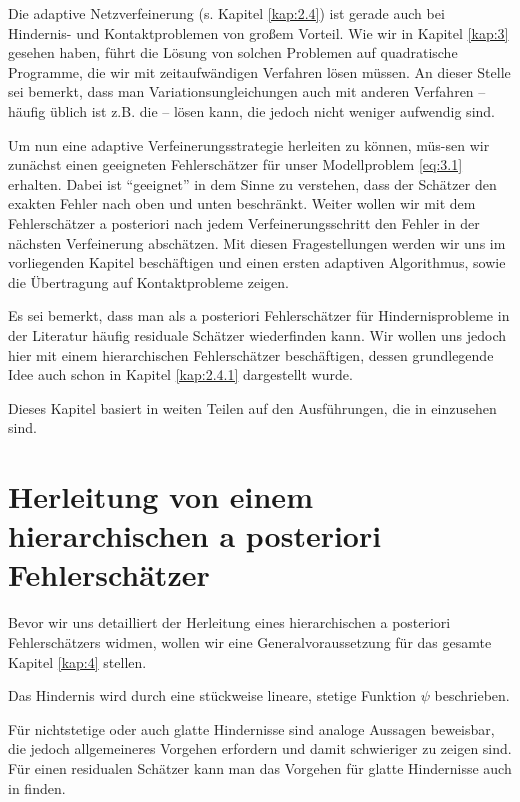 \label{kap:4}


Die adaptive Netzverfeinerung (s. Kapitel \ref{kap:2.4}) ist gerade auch bei Hindernis- und Kontaktproblemen von großem Vorteil. Wie wir in Kapitel \ref{kap:3} gesehen haben, führt die Lösung von solchen Problemen auf quadratische Programme, die wir mit zeitaufwändigen Verfahren lösen müssen. An dieser Stelle sei bemerkt, dass man Variationsungleichungen auch mit anderen Verfahren – häufig üblich ist z.B. die \textit{} – lösen kann, die jedoch nicht weniger aufwendig sind.


Um nun eine adaptive Verfeinerungsstrategie herleiten zu können, müs-sen wir zunächst einen geeigneten Fehlerschätzer für unser Modellproblem \eqref{eq:3.1} erhalten. Dabei ist "`geeignet"' in dem Sinne zu verstehen, dass der Schätzer den exakten Fehler nach oben und unten beschränkt. Weiter wollen wir mit dem Fehlerschätzer a posteriori nach jedem Verfeinerungsschritt den Fehler in der nächsten Verfeinerung abschätzen. Mit diesen Fragestellungen werden wir uns im vorliegenden Kapitel beschäftigen und einen ersten adaptiven Algorithmus, sowie die Übertragung auf Kontaktprobleme zeigen.


Es sei bemerkt, dass man als a posteriori Fehlerschätzer für Hindernisprobleme in der Literatur häufig residuale Schätzer wiederfinden kann. Wir wollen uns jedoch hier mit einem hierarchischen Fehlerschätzer beschäftigen, dessen grundlegende Idee auch schon in Kapitel \ref{kap:2.4.1} dargestellt wurde.

Dieses Kapitel basiert in weiten Teilen auf den Ausführungen, die in \cite{ZouVee} einzusehen sind.




\section{Herleitung von einem hierarchischen a posteriori  Fehlerschätzer}
\label{kap:4.1}

Bevor wir uns detailliert der Herleitung eines hierarchischen a posteriori Fehlerschätzers widmen, wollen wir eine Generalvoraussetzung für das gesamte Kapitel \ref{kap:4} stellen.


\begin{vor}\label{vor:4.1}
Das Hindernis  wird durch eine stückweise lineare, stetige Funktion $\psi$ beschrieben.
\end{vor}


Für nichtstetige oder auch glatte Hindernisse sind analoge Aussagen beweisbar, die jedoch allgemeineres Vorgehen erfordern und damit  schwieriger zu zeigen sind. Für einen residualen Schätzer kann man das Vorgehen für glatte Hindernisse auch in \cite{Page} finden.







